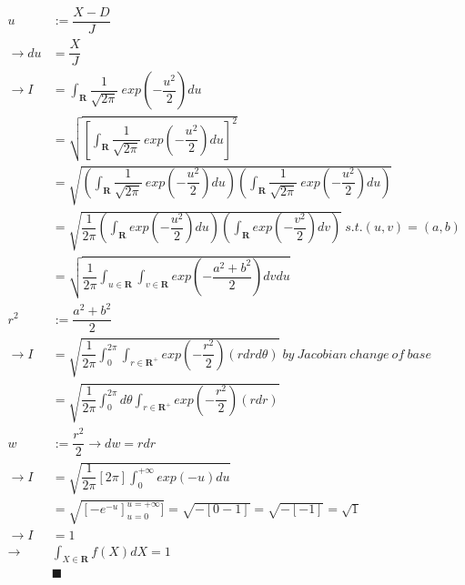 \documentclass[]{article}
\begin{document}
			\begin{align*}
				u &:= \dfrac{X-D}{J} \\
				\to du &= \dfrac{X}{J} \\
				\to I &=\int_\mathbf{R} \dfrac{1}{\sqrt{2\pi}}\ exp(-\dfrac{u^2}{2})du \\
				&= \sqrt{[\int_\mathbf{R} \dfrac{1}{\sqrt{2\pi}}\ exp(-\dfrac{u^2}{2})du]^2} \\
				&= \sqrt{(\int_\mathbf{R} \dfrac{1}{\sqrt{2\pi}}\ exp(-\dfrac{u^2}{2})du)(\int_\mathbf{R} \dfrac{1}{\sqrt{2\pi}}\ exp(-\dfrac{u^2}{2})du)} \\
				&= \sqrt{\dfrac{1}{2\pi}(\int_\mathbf{R}exp(-\dfrac{u^2}{2})du)(\int_\mathbf{R}exp(-\dfrac{v^2}{2})dv)}\ s.t. (u,v)=(a,b) \\
				&= \sqrt{\dfrac{1}{2\pi}\int_{u\in\mathbf{R}}\int_{v\in\mathbf{R}}exp(-\dfrac{a^2+b^2}{2})dvdu} \\
				r^2 &:= \dfrac{a^2+b^2}{2} \\
				\to I &= \sqrt{\dfrac{1}{2\pi}\int_0^{2\pi}\int_{r\in\mathbf{R}^+}exp(-\dfrac{r^2}{2})(rdrd\theta)}\ by\ Jacobian\ change\ of\ base \\
				&= \sqrt{\dfrac{1}{2\pi}\int_0^{2\pi}d\theta \int_{r\in\mathbf{R}^+}exp(-\dfrac{r^2}{2})(rdr)} \\
				w &:= \dfrac{r^2}{2} \to dw = rdr \\
				\to I &= \sqrt{\dfrac{1}{2\pi}[2\pi]\int_0^{+\infty} exp(-u)du} \\
				&= \sqrt{[-e^{-u}]_{u=0}^{u=+\infty}]}
				= \sqrt{-[0 - 1]} = \sqrt{-[-1]} = \sqrt{1} \\
				\to I &= 1 \\
				\to & \int_{X\in\mathbf{R}}f(X)dX = 1\\
				&\blacksquare
			\end{align*}
			
\end{document}
